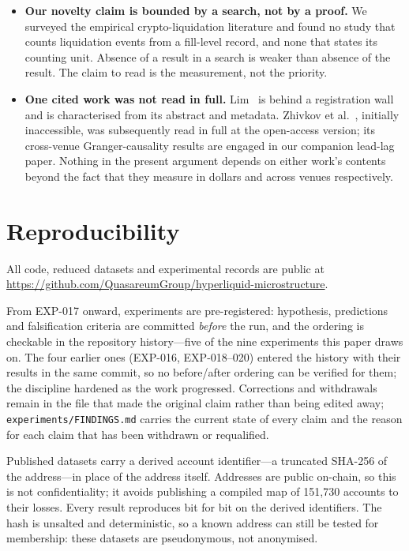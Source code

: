 \documentclass[11pt,a4paper]{article}
\begin{document}
\begin{itemize}
\item \textbf{Our novelty claim is bounded by a search, not by a proof.} We surveyed the
      empirical crypto-liquidation literature and found no study that counts liquidation events
      from a fill-level record, and none that states its counting unit. Absence of a result in a
      search is weaker than absence of the result. The claim to read is the measurement, not
      the priority.
\item \textbf{One cited work was not read in full.} Lim~\cite{lim2026} is behind a
      registration wall and is characterised from its abstract and metadata. Zhivkov et
      al.~\cite{zhivkov2026}, initially inaccessible, was subsequently read in full at the
      open-access version; its cross-venue Granger-causality results are engaged in our
      companion lead-lag paper. Nothing in the present argument depends on either work's
      contents beyond the fact that they measure in dollars and across venues respectively.
\end{itemize}

\section{Reproducibility}
\label{sec:repro}

All code, reduced datasets and experimental records are public at
\url{https://github.com/QuasareumGroup/hyperliquid-microstructure}.

From EXP-017 onward, experiments are pre-registered: hypothesis, predictions and falsification
criteria are committed \emph{before} the run, and the ordering is checkable in the repository
history---five of the nine experiments this paper draws on. The four earlier ones (EXP-016,
EXP-018--020) entered the history with their results in the same commit, so no before/after
ordering can be verified for them; the discipline hardened as the work progressed.
Corrections and withdrawals remain in the file that made the original claim rather than being
edited away; \texttt{experiments/FINDINGS.md} carries the current state of every claim and the
reason for each claim that has been withdrawn or requalified.

Published datasets carry a derived account identifier---a truncated SHA-256 of the address---in
place of the address itself. Addresses are public on-chain, so this is not confidentiality; it
avoids publishing a compiled map of 151{,}730 accounts to their losses. Every result reproduces
bit for bit on the derived identifiers. The hash is unsalted and deterministic, so a known
address can still be tested for membership: these datasets are pseudonymous, not anonymised.
\end{document}
